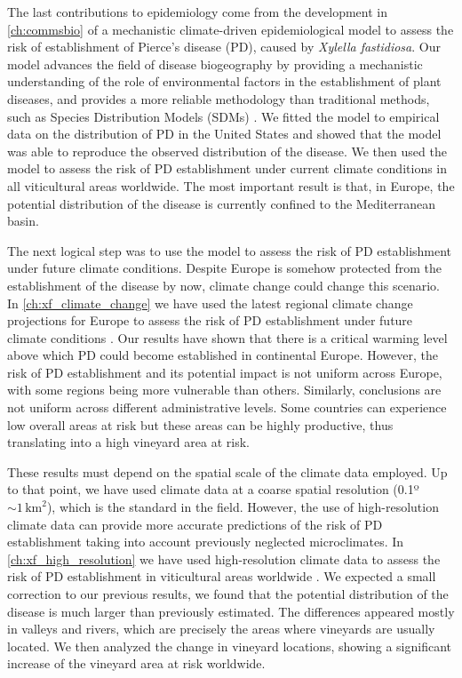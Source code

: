 The last contributions to epidemiology come from the development in
\cref{ch:commsbio} of a mechanistic climate-driven epidemiological model to
assess the risk of establishment of Pierce's disease (PD), caused by
\textit{Xylella fastidiosa}. Our model advances the field of disease
biogeography by providing a mechanistic understanding of the role of
environmental factors in the establishment of plant diseases, and provides
a more reliable methodology than traditional methods, such as Species
Distribution Models (SDMs) \cite{GimenezRomero2022_CommsBio}. We fitted the
model to empirical data on the distribution of PD in the United States and
showed that the model was able to reproduce the observed distribution of the
disease. We then used the model to assess the risk of PD establishment under
current climate conditions in all viticultural areas worldwide. The most
important result is that, in Europe, the potential distribution of the disease
is currently confined to the Mediterranean basin.

The next logical step was to use the model to assess the risk of PD
establishment under future climate conditions. Despite Europe is somehow
protected from the establishment of the disease by now, climate change could
change this scenario. In \cref{ch:xf_climate_change} we have used the latest
regional climate change projections for Europe to assess the risk of PD
establishment under future climate conditions \cite{GimenezRomero2023_PD}.
Our results have shown that there is a critical warming level above which PD
could become established in continental Europe. However, the risk of PD
establishment and its potential impact is not uniform across Europe, with some
regions being more vulnerable than others. Similarly, conclusions are not
uniform across different administrative levels. Some countries can experience
low overall areas at risk but these areas can be highly productive, thus
translating into a high vineyard area at risk.

These results must depend on the spatial scale of the climate data employed. Up
to that point, we have used climate data at a coarse spatial resolution
(0.1º$\sim 1 \, \textrm{km}^2$), which is the standard in the field.
However, the use of high-resolution climate data can provide more accurate
predictions of the risk of PD establishment taking into account previously
neglected microclimates. In \cref{ch:xf_high_resolution} we have used
high-resolution climate data to assess the risk of PD establishment in
viticultural areas worldwide \cite{GimenezRomero2024}. We expected a small
correction to our previous results, we found that the potential distribution of
the disease is much larger than previously estimated. The differences appeared
mostly in valleys and rivers, which are precisely the areas where vineyards are
usually located. We then analyzed the change in vineyard locations, showing a
significant increase of the vineyard area at risk worldwide.

